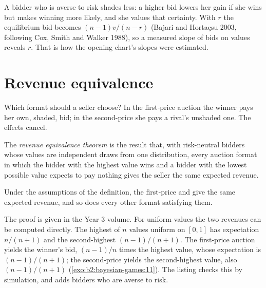 A bidder who is averse to risk shades less: a higher bid lowers her gain if she wins but makes winning more likely,
and she values that certainty. With  $r$ the equilibrium bid becomes $(n - 1)v/(n - r)$
(Bajari and Horta\c{c}su 2003, following Cox, Smith and Walker 1988), so a measured slope of bids on values reveals $r$.
That is how the opening chart's slopes were estimated.

\section{Revenue equivalence}\label{sec:b2:bayesian-games:revenue}

Which format should a seller choose? In the first-price auction the winner pays her own, shaded, bid; in the
second-price she pays a rival's unshaded one. The effects cancel.

\begin{definition}\label{def:b2:bayesian-games:revenue-equivalence}
The \emph{revenue equivalence theorem} is the result that, with risk-neutral
bidders whose values are independent draws from one distribution, every auction format in which the bidder with the
highest value wins and a bidder with the lowest possible value expects to pay nothing gives the seller the same
expected revenue.
\end{definition}

\begin{theorem}\label{thm:b2:bayesian-games:revenue}
Under the assumptions of the definition, the first-price and  give the same expected
revenue, and so does every other format satisfying them.
\end{theorem}

\admitted

The proof is given in the Year 3 volume. For uniform values the two revenues can be computed directly. The highest of
$n$ values uniform on $[0, 1]$ has expectation $n/(n + 1)$ and the second-highest $(n - 1)/(n + 1)$. The first-price auction yields the
winner's bid, $(n - 1)/n$ times the highest value, whose expectation is $(n - 1)/(n + 1)$; the second-price yields the
second-highest value, also $(n - 1)/(n + 1)$ (\cref{exo:b2:bayesian-games:11}). The listing checks this by simulation, and adds
bidders who are averse to risk.


